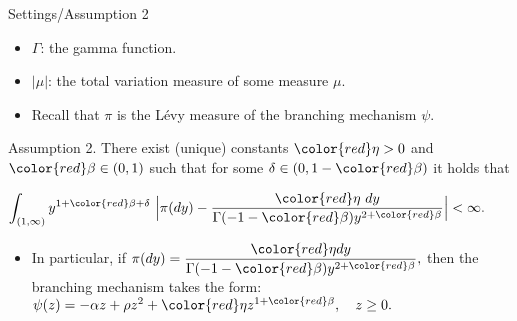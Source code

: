 \documentclass[xcolor=dvipsnames]{beamer}
\begin{document}
\begin{frame}{Settings/Assumption 2}
\begin{itemize}
\item
	$\Gamma$: the gamma function.
\item
	$|\mu|$: the total variation measure of some measure $\mu$.
\item
  Recall that $\pi$ is the L\'evy measure of the branching mechanism $\psi$.
\end{itemize}
\begin{block}{Assumption 2.}
	There exist (unique) constants ${\color{red}\eta} > 0$ and ${\color{red}\beta} \in (0,1)$ such that for some $\delta \in (0, 1- {\color{red}\beta})$ it holds that
  \centerline{ \( \displaystyle	
    \int_{(1,\infty)}y^{1+{\color{red}\beta} +\delta}~\Big|\pi(dy)-\frac{{\color{red}\eta}~dy}{\Gamma(-1-{\color{red}\beta})y^{2+{\color{red}\beta}}}\Big| 
    <\infty.
    \)}
\end{block}
\begin{itemize}
\item
    In particular, if 
    \( \displaystyle
    \pi(dy)
    =\frac{{\color{red}\eta} dy}{ \Gamma(-1-{\color{red}\beta})y^{2+{\color{red}\beta}}},
    \) 
    then the branching mechanism takes the form: 
    \( 
    \psi(z)
    = -\alpha z + \rho z^2 + {\color{red}\eta} z^{1+{\color{red}\beta}}
    ,\quad z\geq 0.
    \)
\end{itemize}
\end{frame}
\end{document}
